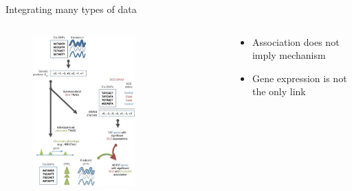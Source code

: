 \documentclass[aspectratio=169,12pt]{beamer}
\begin{document}

\begin{frame}{Integrating many types of data}

	\begin{columns}
		\begin{column}{0.6\textwidth}
			\begin{figure}
				\includegraphics[width=0.63\textwidth]{gusev2018/1-TWAS_schematic_cropped}
			\end{figure}
		\end{column}

		\begin{column}{0.4\textwidth}
			\begin{itemize}
				\item Association does not imply mechanism
				\item Gene expression is not the only link
			\end{itemize}
		\end{column}
	\end{columns}


\end{frame}
\end{document}
